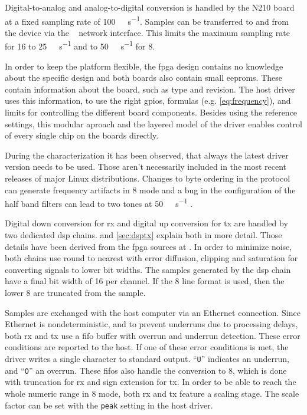 \documentclass[12pt,a4paper,parskip=full,abstracton]{scrartcl}
\begin{document}
Digital-to-analog and analog-to-digital conversion is handled by the N210 board at a fixed sampling rate of
\SI{100}{\mega\samples\per\second}. Samples can be transferred to and from the device via the
\si{\giga\bit} network interface. This limits the maximum sampling rate for \SI{16}{\bit} to
\SI{25}{\mega\samples\per\second} and to \SI{50}{\mega\samples\per\second} for \SI{8}{\bit}.

In order to keep the platform flexible, the \gls{fpga} design contains no knowledge
about the specific design and both boards also contain small \glspl{eeprom}. These contain
information about the board, such as type and revision. The host driver uses this information,
to use the right \glspl{gpio}, formulas (e.g. \cref{eq:frequency}), and limits for controlling
the different board components. Besides using the reference settings, this modular aproach
and the layered model of the driver enables control of every single chip on the boards directly.

During the characterization it has been observed, that always the latest driver version needs to be used. Those aren't
necessarily included in the most recent releases of major Linux distributions. Changes to
byte ordering in the protocol \cite{usrp_byte} can
generate frequency artifacts in \SI{8}{\bit} mode and a bug in the configuration of the half
band filters can lead to two tones at \SI{50}{\mega\samples\per\second} \cite{usrp_hb}.

Digital down conversion for \gls{rx} and digital up conversion for \gls{tx} are handled
by two dedicated \gls{dsp} chains.
 and \cref{sec:dsptx} explain both in more detail. Those details have been derived
from the \gls{fpga} sources at \cite{usrp_src}.
In order to minimize noise, both chains use round to nearest with error diffusion, clipping and saturation
for converting signals to lower bit widths. The samples generated by the \gls{dsp} chain have a final
bit width of \SI{16}{\bit} per channel. If the \SI{8}{\bit} line format is used, then the
lower \SI{8}{\bit} are truncated from the sample.

Samples are exchanged with the host computer via an Ethernet connection. Since Ethernet
is nondeterministic, and to prevent underruns due to processing delays, 
both \gls{rx} and \gls{tx} use a \gls{fifo} buffer with overrun and underrun detection. These
error conditions are reported to the host. If one of these error conditions is met, the driver writes
a single character to standard output. ``\texttt{U}'' indicates an underrun, and ``\texttt{O}''
an overrun. These \glspl{fifo} also handle the
conversion to \SI{8}{\bit}, which is done with truncation for \gls{rx} and sign extension for
\gls{tx}. In order to be able to reach the whole numeric range in \SI{8}{\bit} mode, both
\gls{rx} and \gls{tx} feature a scaling stage. The scale factor can be set with the
\texttt{peak} setting in the host driver.
\end{document}
